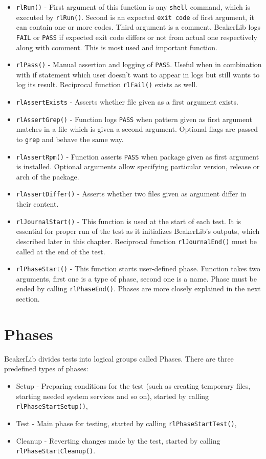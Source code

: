 \begin{itemize}
\item \texttt{rlRun()} - First argument of this function is any \texttt{shell} command, which is executed by \texttt{rlRun()}. Second is an expected \texttt{exit code} of first argument, it can contain one or more codes. Third argument is a comment. BeakerLib logs \texttt{FAIL} or \texttt{PASS} if expected exit code differs or not from actual one respectively along with comment. This is most used and important function.
\item \texttt{rlPass()} - Manual assertion and logging of \texttt{PASS}. Useful when in combination with if statement which user doesn't want to appear in logs but still wants to log its result. Reciprocal function \texttt{rlFail()} exists as well.
\item \texttt{rlAssertExists} - Asserts whether file given as a first argument exists.
\item \texttt{rlAssertGrep()} - Function logs \texttt{PASS} when pattern given as first argument matches in a file which is given a second argument. Optional flags are passed to \texttt{grep} and behave the same way.
\item \texttt{rlAssertRpm()} - Function asserts \texttt{PASS} when package given as first argument is installed.  Optional arguments allow specifying particular version, release or arch of the package.
\item \texttt{rlAssertDiffer()} - Asserts whether two files given as argument differ in their content. 
\item \texttt{rlJournalStart()} - This function is used at the start of each test. It is essential for proper run of the test as it initializes BeakerLib's  outputs, which described later in this chapter. Reciprocal function \texttt{rlJournalEnd()} must be called at the end of the test.
\item \texttt{rlPhaseStart()} - This function starts user-defined phase. Function takes two arguments, first one is a type of phase, second one is a name. Phase must be ended by calling \texttt{rlPhaseEnd()}. Phases are more closely explained in the next section.
\end{itemize}

\section{Phases}
BeakerLib divides tests into logical groups called Phases. There are three predefined types of phases:
\begin{itemize}
\item Setup - Preparing conditions for the test (such as creating temporary files, starting needed system services and so on), started by calling \texttt{rlPhaseStartSetup()},
\item Test - Main phase for testing, started by calling \texttt{rlPhaseStartTest()},
\item Cleanup - Reverting changes made by the test, started by calling \\ \texttt{rlPhaseStartCleanup()}.
\end{itemize}

